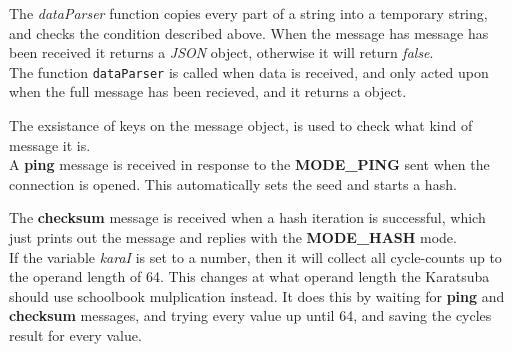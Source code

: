 
The \textit{dataParser} function copies every part of a string into a temporary string, and checks the condition described above. When the message has message has been received it returns a \textit{JSON} object, otherwise it will return \textit{false}.\medskip
\\
The function \texttt{dataParser} is called when data is received, and only acted upon when the full message has been recieved, and it returns a object.  

\medskip
The exsistance of keys on the message object, is used to check what kind of message it is.\\
\medskip
A \textbf{ping} message is received in response to the \textbf{MODE\_PING} sent when the connection is opened. This automatically sets the seed and starts a hash.

\medskip
The \textbf{checksum} message is received when a hash iteration is successful, which just prints out the message and replies with the \textbf{MODE\_HASH} mode.
\label{karatTesting}
\\If the variable \textit{karaI} is set to a number, then it will collect all cycle-counts up to the operand length of 64. This changes at what operand length the Karatsuba should use schoolbook mulplication instead. It does this by waiting for \textbf{ping} and \textbf{checksum} messages, and trying every value up until 64, and saving the cycles result for every value.


